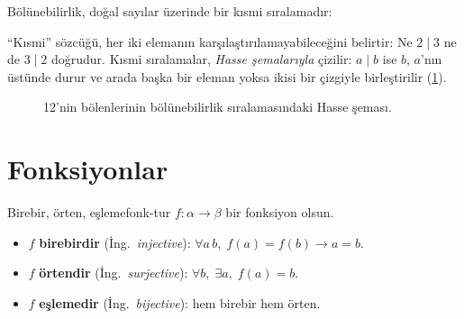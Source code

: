 Bölünebilirlik, doğal sayılar üzerinde bir kısmi sıralamadır:


\noindent ``Kısmi'' sözcüğü, her iki elemanın karşılaştırılamayabileceğini
belirtir: Ne $2 \mid 3$ ne de $3 \mid 2$ doğrudur. Kısmi sıralamalar,
\emph{Hasse şemalarıyla} çizilir: $a \mid b$ ise $b$, $a$'nın üstünde
durur ve arada başka bir eleman yoksa ikisi bir çizgiyle birleştirilir
(\cref{fig:hasse}).

\begin{figure}[htbp]
\centering
{}
\caption{12'nin bölenlerinin bölünebilirlik sıralamasındaki Hasse şeması.}
\label{fig:hasse}
\end{figure}

\section{Fonksiyonlar}\label{sec:fonksiyonlar}

\begin{tanim}{Birebir, örten, eşleme}{fonk-tur}
$f : \alpha \to \beta$ bir fonksiyon olsun.
\begin{itemize}
  \item $f$ \textbf{birebirdir} (İng.\ \emph{injective}):
        $\forall a\,b,\; f(a) = f(b) \to a = b$.
  \item $f$ \textbf{örtendir} (İng.\ \emph{surjective}):
        $\forall b,\; \exists a,\; f(a) = b$.
  \item $f$ \textbf{eşlemedir} (İng.\ \emph{bijective}): hem birebir hem örten.
\end{itemize}
\end{tanim}

